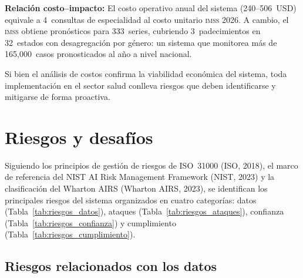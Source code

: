 \documentclass[12pt, letterpaper]{article}
\newenvironment{insightbox}[1][]{\par\medskip\begin{lrbox}{\boxcontents}\begin{minipage}{\dimexpr\textwidth-12pt}\setlength{\emergencystretch}{5em}\setlength{\parskip}{6pt}}{\end{minipage}\end{lrbox}\noindent\colorbox{lightgreen}{\usebox{\boxcontents}}\par\medskip}
\newcommand{\imss}{\textnormal{\textsc{imss}}}
\newcommand{\tabref}[1]{Tabla~\ref{#1}}
\begin{document}
\begin{insightbox}
\textbf{Relación costo--impacto:} El costo operativo anual del sistema (240--506~USD) equivale a 4~consultas de especialidad al costo unitario \imss{} 2026. A cambio, el \imss{} obtiene pronósticos para 333~series, cubriendo 3~padecimientos en 32~estados con desagregación por género: un sistema que monitorea más de 165,000~casos pronosticados al año a nivel nacional.
\end{insightbox}

Si bien el análisis de costos confirma la viabilidad económica del sistema, toda implementación en el sector salud conlleva riesgos que deben identificarse y mitigarse de forma proactiva.

\newpage
\section{Riesgos y desafíos}\label{sec:riesgos}

Siguiendo los principios de gestión de riesgos de ISO~31000 (ISO, 2018), el marco de referencia del NIST AI Risk Management Framework (NIST, 2023) y la clasificación del Wharton AIRS (Wharton AIRS, 2023), se identifican los principales riesgos del sistema organizados en cuatro categorías: datos (\tabref{tab:riesgos_datos}), ataques (\tabref{tab:riesgos_ataques}), confianza (\tabref{tab:riesgos_confianza}) y cumplimiento (\tabref{tab:riesgos_cumplimiento}).

\subsection{Riesgos relacionados con los datos}
\end{document}
